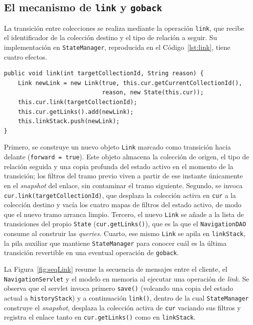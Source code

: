     \subsection{El mecanismo de \texttt{link} y \texttt{goback}}

La transición entre colecciones se realiza mediante la operación \texttt{link}, que recibe
el identificador de la colección destino y el tipo de relación a seguir. Su implementación
en \texttt{StateManager}, reproducida en el Código~\ref{lst:link}, tiene cuatro efectos.

\begin{lstlisting}[style=javaStyle, caption=Operación \texttt{link}, label=lst:link]
public void link(int targetCollectionId, String reason) {
    Link newLink = new Link(true, this.cur.getCurrentCollectionId(),
                            reason, new State(this.cur));
    this.cur.link(targetCollectionId);
    this.cur.getLinks().add(newLink);
    this.linkStack.push(newLink);
}
\end{lstlisting}

Primero, se construye un nuevo objeto \texttt{Link} marcado como transición hacia delante
(\texttt{forward = true}). Este objeto almacena la colección de origen, el tipo de
relación seguida y una copia profunda del estado activo en el momento de la transición; los
filtros del tramo previo viven a partir de ese instante únicamente en el \textit{snapshot} del enlace,
sin contaminar el tramo siguiente. Segundo, se invoca \texttt{cur.link(targetCollectionId)}, que
desplaza la colección activa en \texttt{cur} a la colección destino y vacía los cuatro mapas de
filtros del estado activo, de modo que el nuevo tramo arranca limpio. Tercero, el nuevo
\texttt{Link} se añade a la lista de transiciones del propio \texttt{State}
(\texttt{cur.getLinks()}), que es la que el \texttt{NavigationDAO} consume al construir las
\textit{queries}. Cuarto, ese mismo \texttt{Link} se apila en \texttt{linkStack}, la pila auxiliar que
mantiene \texttt{StateManager} para conocer cuál es la última transición revertible en una
eventual operación de \texttt{goback}.

La Figura~\ref{fig:seqLink} resume la secuencia de mensajes entre el
cliente, el \texttt{Navigation\allowbreak Servlet} y el modelo en memoria al
ejecutar una operación de \textit{link}. Se observa que el servlet
invoca primero \texttt{save()} (volcando una copia del estado actual a
\texttt{historyStack}) y a continuación \texttt{link()}, dentro de
la cual \texttt{StateManager} construye el \textit{snapshot}, desplaza la
colección activa de \texttt{cur} vaciando sus filtros y registra el
enlace tanto en \texttt{cur.getLinks()} como en \texttt{linkStack}.

